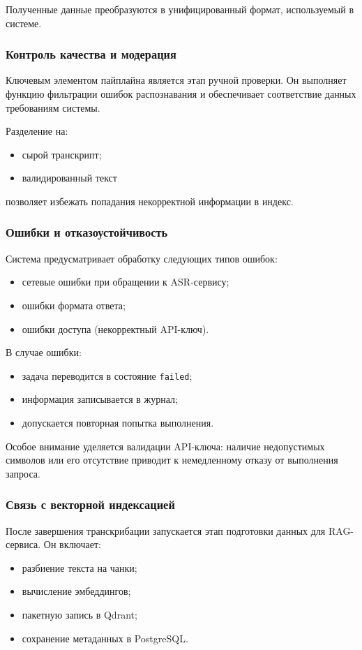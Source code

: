 \documentclass{article}
\begin{document}
Полученные данные преобразуются в унифицированный формат, используемый в системе.

\subsubsection{Контроль качества и модерация}

Ключевым элементом пайплайна является этап ручной проверки. Он выполняет функцию фильтрации ошибок распознавания и обеспечивает соответствие данных требованиям системы.

Разделение на:
\begin{itemize}
\item сырой транскрипт;
\item валидированный текст
\end{itemize}
позволяет избежать попадания некорректной информации в индекс.

\subsubsection{Ошибки и отказоустойчивость}

Система предусматривает обработку следующих типов ошибок:
\begin{itemize}
\item сетевые ошибки при обращении к ASR-сервису;
\item ошибки формата ответа;
\item ошибки доступа (некорректный API-ключ).
\end{itemize}

В случае ошибки:
\begin{itemize}
\item задача переводится в состояние \texttt{failed};
\item информация записывается в журнал;
\item допускается повторная попытка выполнения.
\end{itemize}

Особое внимание уделяется валидации API-ключа: наличие недопустимых символов или его отсутствие приводит к немедленному отказу от выполнения запроса.

\subsubsection{Связь с векторной индексацией}

После завершения транскрибации запускается этап подготовки данных для RAG-сервиса. Он включает:
\begin{itemize}
\item разбиение текста на чанки;
\item вычисление эмбеддингов;
\item пакетную запись в Qdrant;
\item сохранение метаданных в PostgreSQL.
\end{itemize}
\end{document}

